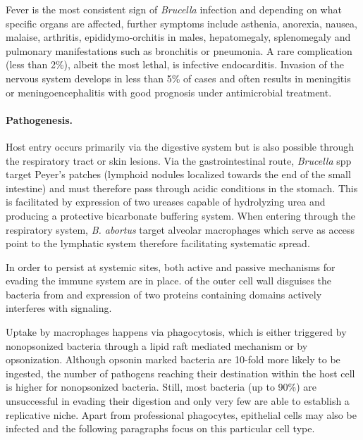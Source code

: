 
Fever is the most consistent sign of \textit{Brucella} infection and depending on what specific organs are affected, further symptoms include asthenia, anorexia, nausea, malaise, arthritis, epididymo-orchitis in males, hepatomegaly, splenomegaly and pulmonary manifestations such as bronchitis or pneumonia. A rare complication (less than 2\%), albeit the most lethal, is infective endocarditis. Invasion of the nervous system develops in less than 5\% of cases and often results in meningitis or meningoencephalitis with good prognosis under antimicrobial treatment.

\paragraph{Pathogenesis.}
Host entry occurs primarily via the digestive system but is also possible through the respiratory tract or skin lesions. Via the gastrointestinal route, \textit{Brucella} \acrshort{spp} target Peyer's patches (lymphoid nodules localized towards the end of the small intestine) and must therefore pass through acidic conditions in the stomach. This is facilitated by expression of two ureases capable of hydrolyzing urea and producing a protective bicarbonate buffering system. When entering through the respiratory system, \textit{B. abortus} target alveolar macrophages which serve as access point to the lymphatic system therefore facilitating systematic spread.

In order to persist at systemic sites, both active and passive mechanisms for evading the immune system are in place.  of the outer cell wall disguises the bacteria from  and expression of two proteins containing  domains actively interferes with  signaling.

Uptake by macrophages happens via phagocytosis, which is either triggered by nonopsonized bacteria through a lipid raft mediated mechanism or by opsonization. Although opsonin marked bacteria are 10-fold more likely to be ingested, the number of pathogens reaching their destination within the host cell is higher for nonopsonized bacteria. Still, most bacteria (up to 90\%) are unsuccessful in evading their digestion and only very few are able to establish a replicative niche. Apart from professional phagocytes, epithelial cells may also be infected and the following paragraphs focus on this particular cell type.

